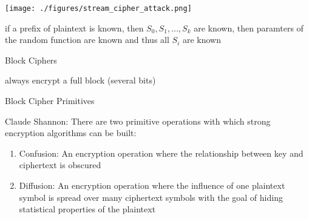 \documentclass[landscape, a4paper]{article}
\begin{document}
\begin{minipage}[t]{0.198\pagewidth}
\begin{betterlist}
\begin{betterlist}
\begin{betterlist}
				\texttt{[image: ./figures/stream\_cipher\_attack.png]}
				\begin{betterlist}
					\item if a prefix of plaintext is known, then $S_0, S_1, \ldots, S_k$ are known, then paramters of the random function are known and thus all $S_i$ are known
				\end{betterlist}
			\end{betterlist}
		\end{betterlist}
	\end{betterlist}
	\begin{betterlist}
		\item \alert{Block Ciphers}
		\begin{betterlist}
			\item always encrypt a full block (several bits)
			\item Block Cipher Primitives
			\begin{betterlist}
				\item \alert{Claude Shannon:} There are two primitive operations with which strong encryption algorithms can be built:
				\begin{enumerate}
					\item \alert{Confusion:} An encryption operation where the \alert{relationship between key and ciphertext is obscured}
					\item \alert{Diffusion:} An encryption operation where the \alert{influence of one plaintext symbol is spread over many ciphertext symbols} with the goal of hiding statistical properties of the plaintext
				\end{enumerate}
				\begin{betterlist}

\end{betterlist}
\end{betterlist}
\end{betterlist}
\end{betterlist}
\end{minipage}
\end{document}
